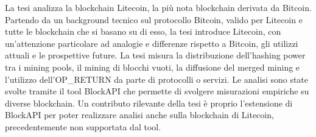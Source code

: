 \vspace{4cm}
La tesi analizza la blockchain Litecoin, la più nota blockchain derivata da Bitcoin. Partendo da un background tecnico sul protocollo Bitcoin, valido per Litecoin e tutte le blockchain che si basano su di esso, la tesi introduce Litecoin, con un'attenzione particolare ad analogie e differenze rispetto a Bitcoin, gli utilizzi attuali e le prospettive future.
La tesi misura la distribuzione dell’hashing power tra i mining pools, il mining di blocchi vuoti, la diffusione del merged mining e l’utilizzo dell’OP\_RETURN da parte di protocolli o servizi. 
Le analisi sono state svolte tramite il tool BlockAPI che permette di svolgere misurazioni empiriche su diverse blockchain. Un contributo rilevante della tesi è proprio l'estensione di BlockAPI per poter realizzare analisi anche sulla blockchain di Litecoin, precedentemente non supportata dal tool. 